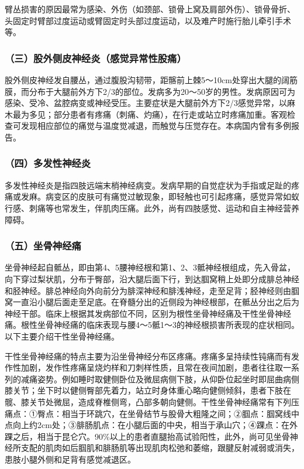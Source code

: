 臂丛损害的原因最常为感染、外伤（如颈部、锁骨上窝及肩部外伤）、锁骨骨折、头固定时臂部过度运动或臂固定时头部过度运动，以及难产时施行胎儿牵引手术等。

\subsubsection{（三）股外侧皮神经炎（感觉异常性股痛）}

股外侧皮神经发自腰丛，通过腹股沟韧带，距髂前上棘5～10cm处穿出大腿的阔筋膜，而分布于大腿前外方下2/3的部位。发病多为20～50岁的男性。发病原因可为感染、受冷、盆腔病变或神经受压。主要症状是大腿前外方下2/3感觉异常，以麻木最为多见；部分患者有疼痛（刺痛、灼痛），在行走或站立时疼痛加重。客观检查可发现相应部位的痛觉与温度觉减退，而触觉与压觉存在。本病国内曾有多例报告。

\subsubsection{（四）多发性神经炎}

多发性神经炎是指四肢远端末梢神经病变。发病早期的自觉症状为手指或足趾的疼痛或发麻。病变区的皮肤可有痛觉过敏现象，即轻触也可引起疼痛，感觉异常如蚁行感、刺痛等也常发生，伴肌肉压痛。此外，尚有四肢感觉、运动和自主神经营养障碍。

\subsubsection{（五）坐骨神经痛}

坐骨神经起自骶丛，即由第4、5腰神经根和第1、2、3骶神经根组成，先入骨盆，向下穿过梨状肌，分布于臀部，沿大腿后面下行，到达腘窝稍上处即分成腓总神经和胫神经。腓总神经向外向前分为腓深神经和腓浅神经，走至足背；胫神经则由腘窝一直沿小腿后面走至足底。在脊髓分出的近侧段为神经根部，在骶丛分出之后为神经干部。临床上根据其发病部位不同，区别为根性坐骨神经痛及干性坐骨神经痛。根性坐骨神经痛的临床表现与腰4～5骶1～3的神经根损害所表现的症状相同。以下主要介绍干性坐骨神经痛。

干性坐骨神经痛的特点主要为沿坐骨神经分布区疼痛。疼痛多呈持续性钝痛而有发作性加剧，发作性疼痛呈烧灼样和刀刺样性质，且常在夜间加剧，患者往往取一系列的减痛姿势。例如睡时取健侧卧位及微屈病侧下肢，从仰卧位起坐时即屈曲病侧膝关节；坐下时以健侧臀部先着力，站立时身体重心略向健侧倾斜，患者下肢在髋、膝关节处微屈，造成脊椎侧弯，凸部多朝向健侧。干性坐骨神经痛常有下列压痛点：①臀点：相当于环跳穴，在坐骨结节与股骨大粗隆之间；②腘点：腘窝线中点向上约2cm处；③腓肠肌点：在小腿后面的中央，相当于承山穴；④踝点：在外踝之后，相当于昆仑穴。90\%以上的患者直腿抬高试验阳性，此外，尚可见坐骨神经所支配的肌肉如后腘肌和腓肠肌等出现肌肉松弛和萎缩，跟腱反射减弱或消失，患肢小腿外侧和足背有感觉减退区。

